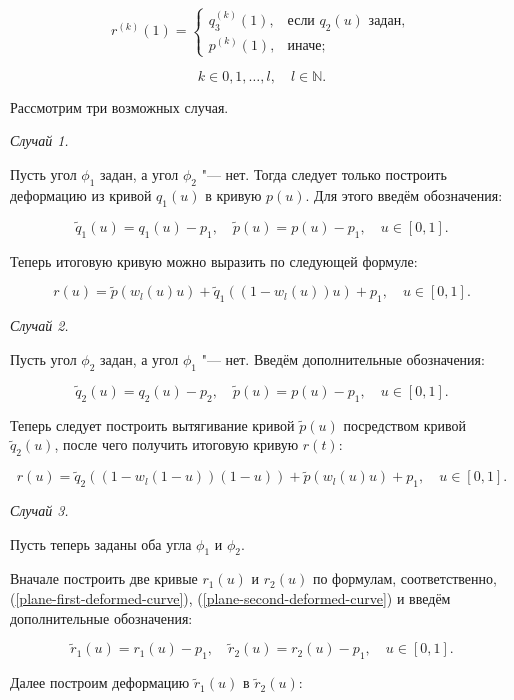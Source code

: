 \begin{equation*}
r^{(k)}(1)=
  \begin{cases}
    q_3^{(k)}(1), & \text{если $q_2(u)$ задан}, \\
    p^{(k)}(1),   & \text{иначе};
  \end{cases}
\end{equation*}

$$
k \in {0,1,\dots,l}, \quad l \in \mathbb{N}.
$$

Рассмотрим три возможных случая.

\bigskip
\textit{Случай 1.}

Пусть угол $\phi_1$ задан, а угол $\phi_2$ "--- нет. Тогда следует только построить деформацию из кривой $q_1(u)$ в
кривую $p(u)$. Для этого введём обозначения:

$$
\tilde q_1(u)=q_1(u)-p_1, \quad \tilde p(u)=p(u)-p_1, \quad u \in [0,1].
$$

Теперь итоговую кривую можно выразить по следующей формуле:

\begin{equation}
r(u)=\tilde p(w_l(u)u)+\tilde q_1((1-w_l(u))u)+p_1, \quad u \in [0,1].
\label{plane-first-deformed-curve}
\end{equation}

\bigskip
\textit{Случай 2.}

Пусть угол $\phi_2$ задан, а угол $\phi_1$ "--- нет. Введём дополнительные обозначения:

$$
\tilde q_2(u)=q_2(u)-p_2, \quad \tilde p(u)=p(u)-p_1, \quad u \in [0,1].
$$

Теперь следует построить вытягивание кривой $\tilde p(u)$ посредством кривой $\tilde q_2(u)$, после чего получить
итоговую кривую $r(t)$:

\begin{equation}
r(u)=\tilde q_2((1-w_l(1-u))(1-u))+\tilde p(w_l(u)u)+p_1, \quad u \in [0,1].
\label{plane-second-deformed-curve}
\end{equation}

\bigskip
\textit{Случай 3.}

Пусть теперь заданы оба угла $\phi_1$ и $\phi_2$.

Вначале построить две кривые $r_1(u)$ и $r_2(u)$ по формулам, соответственно, (\ref{plane-first-deformed-curve}),
(\ref{plane-second-deformed-curve}) и введём дополнительные обозначения:

$$
\tilde r_1(u)=r_1(u)-p_1, \quad \tilde r_2(u)=r_2(u)-p_1, \quad u \in [0,1].
$$

Далее построим деформацию $\tilde r_1(u)$ в $\tilde r_2(u)$:

